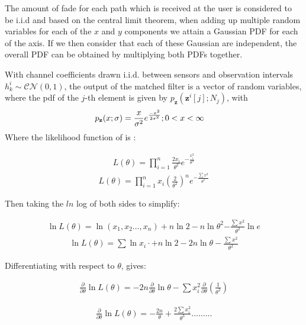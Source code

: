 \documentclass{article}
\begin{document}
The amount of fade for each path which is received at the user is considered to be i.i.d and based on the central limit theorem, when adding up multiple random variables for each of the $x$ and $y$ components we attain a Gaussian PDF for each of the axis. If we then consider that each of these Gaussian are independent, the overall PDF can be obtained by multiplying both PDFs together. 

With channel coefficients drawn i.i.d. between sensors and observation intervals $h^i_k \sim \mathcal{CN}(0, 1)$, the output of the matched filter is a vector of random variables, where the pdf of the $j$-th element is given by $p_{\mathbf{z}}(\boldsymbol{z}^i[j]; N_j)$, with  
%
\begin{align}
    p_{\mathbf{z}}(x; \sigma) &= \frac{x}{\sigma^2} e^{\frac{-x^2}{2\sigma^2}} ; 
    \newline 0 < x < \infty
\end{align} 
%
Where the likelihood function of is :

\begin{align}
    L(\theta) = \prod_{i=1}^n\frac{2x_{i}}{\theta^2}e^{-\frac{x_{i}^2}{\theta^2}}
\end{align}
\begin{align}
    L(\theta) = \prod_{i=1}^n x_{i}(\frac{2}{\theta^2})^n e^{-\frac{\sum{x^2}}{\theta^2}}
\end{align}

Then taking the $ln$ log of both sides to simplify:

\begin{align}
    \ln{L(\theta)}= \ln{(x_{1},x_{2}\dots,x_{n})} + n\ln{2} - n\ln\theta^2 {-\frac{\sum{x^2}}{\theta^2}}\ln{e}
\end{align}
\begin{align}
    \ln{L(\theta)}= \sum\ln{x_{i}} \cdot + n\ln{2} - 2n\ln{\theta} -\frac{\sum{x^2}}{\theta^2}
\end{align}

Differentiating with respect to $\theta$, gives:

\begin{align}
    \frac{\partial }{\partial \theta}\ln L{(\theta)} = -2n\frac{\partial}{\partial\theta}\ln\theta - \sum x_{i}^2\frac{\partial}{\partial\theta}(\frac{1}{\theta^2})
\end{align}

\begin{align}
    \frac{\partial }{\partial \theta}\ln L{(\theta)} = -\frac{2n}{\theta} + \frac{2\sum x_{i}^2}{\theta^3} \dots \dots \dots
\end{align}
\end{document}
